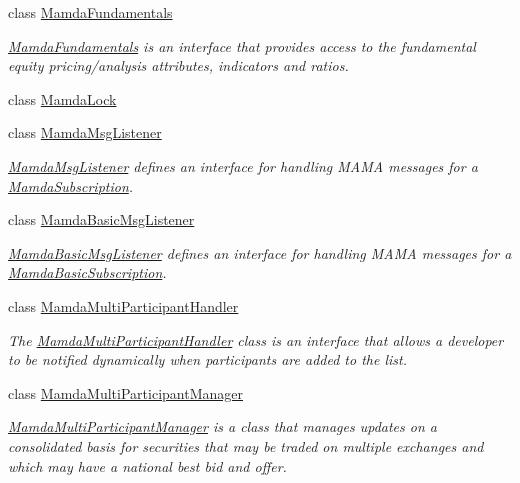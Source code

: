\begin{CompactItemize}
class \hyperlink{classWombat_1_1MamdaFundamentals}{Mamda\-Fundamentals}
\begin{CompactList}\small\item\em \hyperlink{classWombat_1_1MamdaFundamentals}{Mamda\-Fundamentals} is an interface that provides access to the fundamental equity pricing/analysis attributes, indicators and ratios. \item\end{CompactList}\item 
class \hyperlink{classWombat_1_1MamdaLock}{Mamda\-Lock}
\item 
class \hyperlink{classWombat_1_1MamdaMsgListener}{Mamda\-Msg\-Listener}
\begin{CompactList}\small\item\em \hyperlink{classWombat_1_1MamdaMsgListener}{Mamda\-Msg\-Listener} defines an interface for handling MAMA messages for a \hyperlink{classWombat_1_1MamdaSubscription}{Mamda\-Subscription}. \item\end{CompactList}\item 
class \hyperlink{classWombat_1_1MamdaBasicMsgListener}{Mamda\-Basic\-Msg\-Listener}
\begin{CompactList}\small\item\em \hyperlink{classWombat_1_1MamdaBasicMsgListener}{Mamda\-Basic\-Msg\-Listener} defines an interface for handling MAMA messages for a \hyperlink{classWombat_1_1MamdaBasicSubscription}{Mamda\-Basic\-Subscription}. \item\end{CompactList}\item 
class \hyperlink{classWombat_1_1MamdaMultiParticipantHandler}{Mamda\-Multi\-Participant\-Handler}
\begin{CompactList}\small\item\em The \hyperlink{classWombat_1_1MamdaMultiParticipantHandler}{Mamda\-Multi\-Participant\-Handler} class is an interface that allows a developer to be notified dynamically when participants are added to the list. \item\end{CompactList}\item 
class \hyperlink{classWombat_1_1MamdaMultiParticipantManager}{Mamda\-Multi\-Participant\-Manager}
\begin{CompactList}\small\item\em \hyperlink{classWombat_1_1MamdaMultiParticipantManager}{Mamda\-Multi\-Participant\-Manager} is a class that manages updates on a consolidated basis for securities that may be traded on multiple exchanges and which may have a national best bid and offer. \item\end{CompactList}\item 

\end{CompactItemize}
